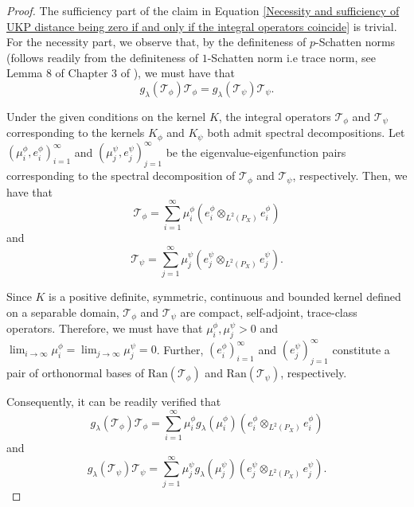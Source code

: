 \documentclass{article} %
\newcommand{\range}{\text{Ran}}
\newcommand{\repone}{\phi}
\newcommand{\reptwo}{\psi}
\newcommand{\Tone}{\mathcal{T}_{\repone}}
\newcommand{\Ttwo}{\mathcal{T}_{\reptwo}}
\newcommand{\gl}{g_{\lambda}}
\newcommand{\LPtwo}{L^{2}(P_{X})}
\theoremstyle{plain}
\begin{document}
\begin{proof}
    The sufficiency part of the claim in Equation \ref{Necessity and sufficiency of UKP distance being zero if and only if the integral operators coincide} is trivial. For the necessity part, we observe that, by the definiteness of $p$-Schatten norms (follows readily from the definiteness of $1$-Schatten norm i.e trace norm, see Lemma 8 of Chapter 3 of \citet{Schattennormbook}), we must have that 
    \begin{equation}\label{regularized integral operators coincide}
    \gl(\Tone) \Tone = \gl(\Ttwo) \Ttwo.
    \end{equation}

    Under the given conditions on the kernel $K$, the integral operators $\Tone$ and $\Ttwo$ corresponding to the kernels $K_{\repone}$ and $K_{\reptwo}$ both admit spectral decompositions. Let $\left(\mu_{i}^{\repone},e_{i}^{\repone}\right)_{i=1}^{\infty}$ and $\left(\mu_{j}^{\reptwo},e_{j}^{\reptwo}\right)_{j=1}^{\infty}$ be the eigenvalue-eigenfunction pairs corresponding to the spectral decomposition of $\Tone$ and $\Ttwo$, respectively. Then, we have that
    \begin{equation*}\label{Spectral decomposition of Tf}
        \Tone = \sum_{i=1}^{\infty} \mu_{i}^{\repone} \left(e_{i}^{\repone} \otimes_{\LPtwo} e_{i}^{\repone}\right)
    \end{equation*}
    and
    \begin{equation*}\label{Spectral decomposition of Tg}
        \Ttwo = \sum_{j=1}^{\infty} \mu_{j}^{\reptwo} \left(e_{j}^{\reptwo} \otimes_{\LPtwo} e_{j}^{\reptwo}\right).
    \end{equation*}

    Since $K$ is a positive definite, symmetric, continuous and bounded kernel defined on a separable domain, $\Tone$ and $\Ttwo$ are compact, self-adjoint, trace-class operators. Therefore, we must have that $\mu_{i}^{\repone},\mu_{j}^{\reptwo} > 0$ and $\lim_{i \to \infty} \mu_{i}^{\repone} = \lim_{j \to \infty} \mu_{j}^{\reptwo} = 0$. Further, $(e_{i}^{\repone})_{i=1}^{\infty}$ and $(e_{j}^{\reptwo})_{j=1}^{\infty}$ constitute a pair of orthonormal bases of $\range(\Tone)$ and $\range(\Ttwo)$, respectively.

    Consequently, it can be readily verified that
    \begin{equation*}\label{Spectral decomposition of regualrized Tf}
        \gl(\Tone)\Tone = \sum_{i=1}^{\infty} \mu_{i}^{\repone}\gl(\mu_{i}^{\repone}) \left(e_{i}^{\repone} \otimes_{\LPtwo} e_{i}^{\repone}\right)
    \end{equation*}
    and
    \begin{equation*}\label{Spectral decomposition of regularized Tg}
        \gl(\Ttwo)\Ttwo = \sum_{j=1}^{\infty} \mu_{j}^{\reptwo} \gl(\mu_{j}^{\reptwo}) \left(e_{j}^{\reptwo} \otimes_{\LPtwo} e_{j}^{\reptwo}\right).
    \end{equation*}


\end{proof}
\end{document}
